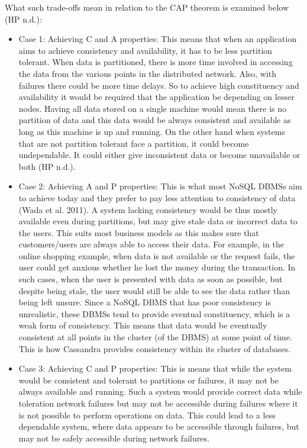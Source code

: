 What such trade-offs mean in relation to the CAP theorem is examined below (HP
n.d.):

\begin{itemize}
  \item Case 1: Achieving C and A properties: This means that when an application aims
to achieve consistency and availability, it has to be less partition tolerant.
When data is partitioned, there is more time involved in accessing the data from
the various points in the distributed network. Also, with failures there could
be more time delays. So to achieve high constituency and availability it would
be required that the application be depending on lesser nodes. Having all data
stored on a single machine would mean there is no partition of data and this
data would be always consistent and available as long as this machine is up and
running.  On the other hand when systems that are not partition tolerant face a
partition, it could become undependable. It could either give inconsistent data
or become unavailable or both (HP n.d.).
\item Case 2: Achieving A and P properties: This is what most NoSQL DBMSs aim to
achieve today and they prefer to pay less attention to consistency of data (Wada
et al. 2011). A system lacking consistency would be thus mostly available even
during partitions, but may give stale data or incorrect data to the users. This
suits most business models as this makes sure that customers/users are always
able to access their data. For example, in the online shopping example, when
data is not available or the request fails, the user could get anxious whether
he lost the money during the transaction. In such cases, when the user is
presented with data as soon as possible, but despite being stale, the user would
still be able to see the data rather than being left unsure.
Since a NoSQL DBMS that has poor consistency is unrealistic, these DBMSs tend to
provide eventual constituency, which is a weak form of consistency. This means
that data would be eventually consistent at all points in the cluster (of the
DBMS) at some point of time. This is how Cassandra provides consistency within
its cluster of databases.
\item Case 3: Achieving C and P properties: This is means that while the system
would be consistent and tolerant to partitions or failures, it may not be always
available and running. Such a system would provide correct data while toleration
network failures but may not be accessible during failures where it is not
possible to perform operations on data. This could lead to a less dependable
system, where data appears to be accessible through failures, but may not be
safely accessible during network failures.
\end{itemize}

